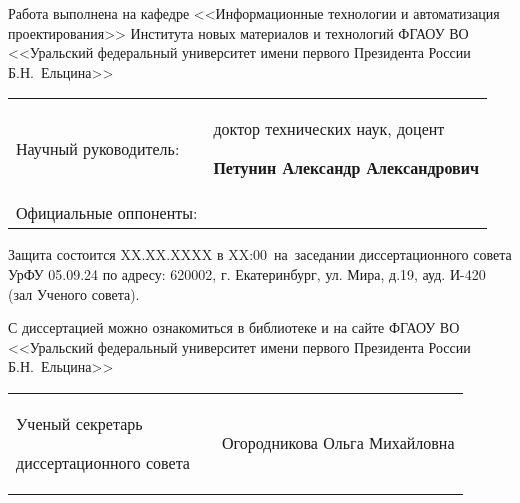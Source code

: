 
\thispagestyle{empty}
\noindent
Работа выполнена
на кафедре
<<Информационные технологии и автоматизация проектирования>>
Института новых материалов и технологий
ФГАОУ ВО
<<Уральский федеральный университет имени первого Президента России Б.Н.~Ельцина>>

\vspace{0.008\paperheight plus1fill}

\begin{tabularx}{\textwidth}{@{}lX@{}}
  Научный руководитель:   & доктор технических наук, доцент \par
                            \textbf{Петунин Александр Александрович}
                            \vspace{0.013\paperheight}\\
  Официальные оппоненты:  &
\end{tabularx}

\vspace{0.008\paperheight plus1fill}

\noindent
Защита состоится
XX.XX.XXXX
в XX:00~на~заседании
диссертационного совета
УрФУ 05.09.24 по адресу:
620002, г. Екатеринбург, ул. Мира, д.19, ауд. И-420
(зал Ученого совета).

\vspace{0.008\paperheight plus1fill}
\noindent
С диссертацией можно ознакомиться в библиотеке
и на сайте ФГАОУ ВО
<<Уральский федеральный университет имени первого Президента России Б.Н.~Ельцина>>

\vspace{0.008\paperheight plus1fill}

\vspace{0.008\paperheight plus1fill}
\noindent%
\begin{tabularx}{\textwidth}{@{}%
>{\raggedright\arraybackslash}b{18em}@{}
>{\centering\arraybackslash}X
r
@{}}
    Ученый секретарь\par
    диссертационного совета
    &
    &
    Огородникова Ольга Михайловна
\end{tabularx}


\clearpage
